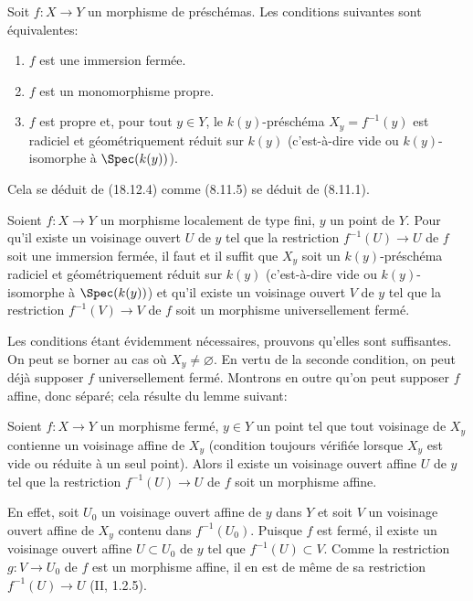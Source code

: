 \begin{corollary}[18.12.6]
\label{IV.18.12.6}
Soit $f:X\to Y$ un morphisme de préschémas. Les conditions suivantes sont équivalentes:
\begin{enumerate}
  \item[$a)$] $f$ est une immersion fermée.
  \item[$b)$] $f$ est un monomorphisme propre.
  \item[$c)$] $f$ est propre et, pour tout $y\in Y$, le $k(y)$-préschéma $X_y=f^{-1}(y)$ est radiciel et géométriquement réduit sur $k(y)$ (c'est-à-dire vide ou $k(y)$-isomorphe à $\Spec(k(y))$).
\end{enumerate}
\end{corollary}

Cela se déduit de (18.12.4) comme (8.11.5) se déduit de (8.11.1).

\begin{proposition}[18.12.7]
\label{IV.18.12.7}
Soient $f:X\to Y$ un morphisme localement de type fini, $y$ un point de $Y$. Pour qu'il existe un voisinage ouvert $U$ de $y$ tel que la restriction $f^{-1}(U)\to U$ de $f$ soit une immersion fermée, il faut et il suffit que $X_y$ soit un $k(y)$-préschéma radiciel et géométriquement réduit sur $k(y)$ (c'est-à-dire vide ou $k(y)$-isomorphe à $\Spec(k(y))$) et qu'il existe un voisinage ouvert $V$ de $y$ tel que la restriction $f^{-1}(V)\to V$ de $f$ soit un morphisme universellement fermé.
\end{proposition}

Les conditions étant évidemment nécessaires, prouvons qu'elles sont suffisantes. On peut se borner au cas où $X_y\neq\varnothing$. En vertu de la seconde condition, on peut déjà supposer $f$ universellement fermé. Montrons en outre qu'on peut supposer $f$ affine, donc séparé; cela résulte du lemme suivant:

\begin{lemma}[18.12.7.1]
\label{IV.18.12.7.1}
Soient $f:X\to Y$ un morphisme fermé, $y\in Y$ un point tel que tout voisinage de $X_y$ contienne un voisinage affine de $X_y$ (condition toujours vérifiée lorsque $X_y$ est vide ou réduite à un seul point). Alors il existe un voisinage ouvert affine $U$ de $y$ tel que la restriction $f^{-1}(U)\to U$ de $f$ soit un morphisme affine.
\end{lemma}

En effet, soit $U_0$ un voisinage ouvert affine de $y$ dans $Y$ et soit $V$ un voisinage ouvert affine de $X_y$ contenu dans $f^{-1}(U_0)$. Puisque $f$ est fermé, il existe un voisinage ouvert affine $U\subset U_0$ de $y$ tel que $f^{-1}(U)\subset V$. Comme la restriction $g:V\to U_0$ de $f$ est un morphisme affine, il en est de même de sa restriction $f^{-1}(U)\to U$ (II, 1.2.5).

